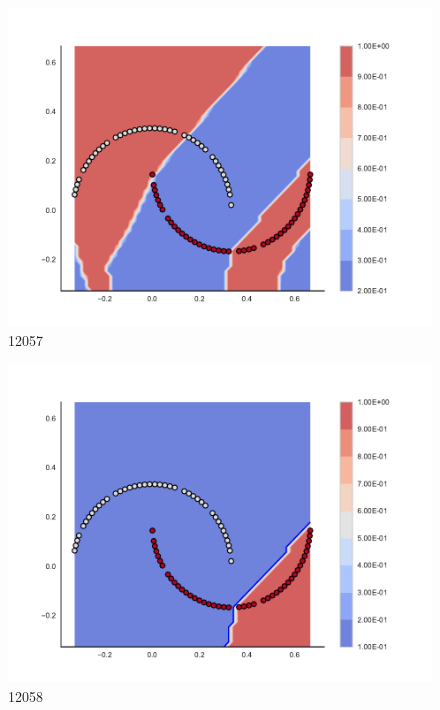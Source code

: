 \begin{subfigure}[b]{0.09\textwidth}
    \includegraphics[clip, trim=2.35cm 1.75cm 4.5cm 0cm,width=\textwidth]{img/convergence/12057.pdf}
    \caption{12057}
    \label{fig:convergence_12057}
\end{subfigure}
%
\begin{subfigure}[b]{0.09\textwidth}
    \includegraphics[clip, trim=2.35cm 1.75cm 4.5cm 0cm,width=\textwidth]{img/convergence/12058.pdf}
    \caption{12058}
    \label{fig:convergence_12058}
\end{subfigure}
%
